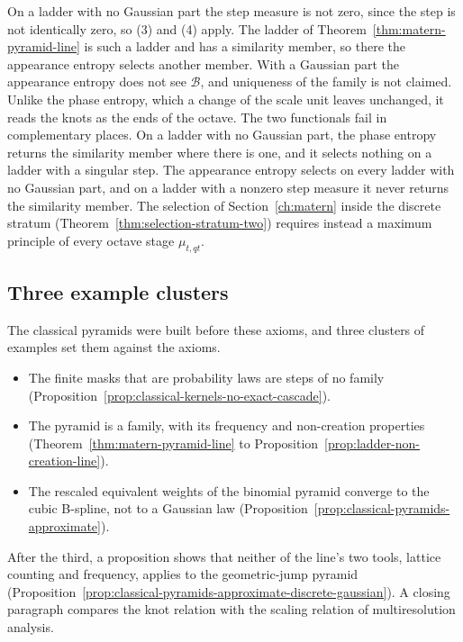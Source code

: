On a ladder with no Gaussian part the step measure is not zero, since the step is not identically
zero, so (3) and (4) apply. The \Matern{} ladder of Theorem~\ref{thm:matern-pyramid-line} is such a
ladder and has a similarity member, so there the appearance entropy selects another member. With a
Gaussian part the appearance entropy does not see $\mathcal{B}$, and uniqueness of the family is not
claimed. Unlike the phase entropy, which a change of the scale unit leaves unchanged, it reads the
knots as the ends of the octave. The two functionals fail in complementary places. On a ladder with
no Gaussian part, the phase entropy returns the similarity member where there is one, and it
selects nothing on a ladder with a singular step. The appearance entropy selects on every ladder
with no Gaussian part, and on a ladder with a nonzero step measure it never returns the similarity
member. The selection of Section~\ref{ch:matern} inside the discrete stratum
(Theorem~\ref{thm:selection-stratum-two}) requires instead a maximum principle of every octave stage $\mu_{t,qt}$.

\subsection{Three example clusters}
\label{sec:line-examples}

The classical pyramids were built before these axioms, and three clusters of examples set them
against the axioms.
\begin{itemize}
\item The finite masks that are probability laws are steps of no family
(Proposition~\ref{prop:classical-kernels-no-exact-cascade}).
\item The \Matern{} pyramid is a family, with its \Polya{} frequency and non-creation properties
(Theorem~\ref{thm:matern-pyramid-line} to Proposition~\ref{prop:ladder-non-creation-line}).
\item The rescaled equivalent weights of the binomial pyramid converge to the cubic B-spline, not to a
Gaussian law (Proposition~\ref{prop:classical-pyramids-approximate}).
\end{itemize}
After the third, a proposition shows that neither of the line's two tools, lattice counting and
\Polya{} frequency, applies to the geometric-jump pyramid
(Proposition~\ref{prop:classical-pyramids-approximate-discrete-gaussian}). A closing paragraph
compares the knot relation with the scaling relation of multiresolution analysis.


